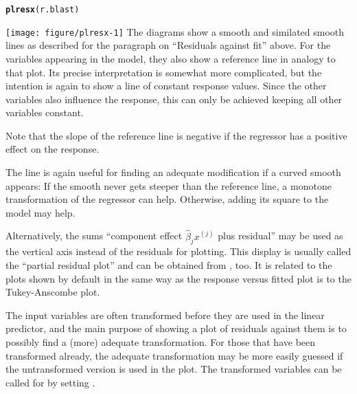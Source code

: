 \documentclass[11pt]{article}\usepackage[]{graphicx}\usepackage[]{color}
\makeatletter
\newcommand{\hlstd}[1]{\textcolor[rgb]{0.345,0.345,0.345}{#1}}%
\newcommand{\hlkwd}[1]{\textcolor[rgb]{0.737,0.353,0.396}{\textbf{#1}}}%
\newenvironment{kframe}{%
 \def\at@end@of@kframe{}%
 \ifinner\ifhmode%
  \def\at@end@of@kframe{\end{minipage}}%
  \begin{minipage}{\columnwidth}%
 \fi\fi%
 \def\FrameCommand##1{\hskip\@totalleftmargin \hskip-\fboxsep
 \colorbox{shadecolor}{##1}\hskip-\fboxsep
     \hskip-\linewidth \hskip-\@totalleftmargin \hskip\columnwidth}%
 \MakeFramed {\advance\hsize-\width
   \@totalleftmargin\z@ \linewidth\hsize
   \@setminipage}}%
 {\par\unskip\endMakeFramed%
 \at@end@of@kframe}
\newenvironment{knitrout}{}{} %
\makeatother
\begin{document}
\begin{knitrout}
\color{fgcolor}\begin{kframe}
\begin{alltt}
\hlkwd{plresx}\hlstd{(r.blast)}
\end{alltt}
\end{kframe}
\texttt{[image: figure/plresx-1]} 
\end{knitrout}
The diagrams show a smooth and similated smooth lines as described
for the paragraph on ``Residuals against fit'' above.
For the variables appearing in the model, they also show a reference line 
in analogy to that plot.
Its precise interpretation is somewhat more complicated, but the intention
is again to show a line of constant response values.
Since the other variables also influence the response, 
this can only be achieved keeping all other variables constant.


Note that the slope of the reference line is negative if the regressor has
a positive effect on the response.

The line is again useful for finding an adequate modification if a curved
smooth appears: If the smooth never gets steeper than the reference line,
a monotone transformation of the regressor can help. 
Otherwise, adding its square to the model may help.

Alternatively, the sums 
``component effect $\widehat\beta_j x^{(j)}$ plus residual''
may be used as the vertical axis instead of the
residuals for plotting. This display is usually called the 
``partial residual plot'' and can be obtained from , too. 
It is related to the plots shown by default in the same way as the
response versus fitted plot is to the Tukey-Anscombe plot.

The input variables are often transformed before they are used 
in the linear predictor,
and the main purpose of showing a plot of residuals against them is
to possibly find a (more) adequate transformation.
For those that have been transformed already, the adequate transformation 
may be more easily guessed if the untransformed version is used in the
plot. The transformed variables can be called for by setting
.
\end{document}
